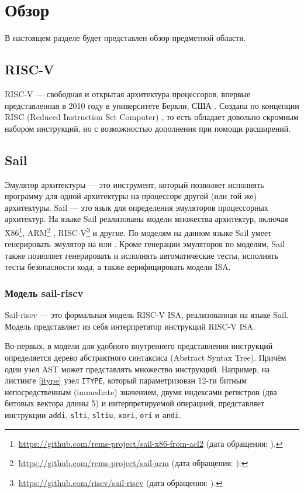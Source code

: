 
\section{Обзор}
\label{sec:relatedworks}

В настоящем разделе будет представлен обзор предметной области.

\subsection{RISC-V}
RISC-V --- свободная и открытая архитектура процессоров, впервые представленная в 2010 году в университете Беркли, США \cite{waterman2016design}.
Создана по концепции RISC (Reduced Instruction Set Computer) \cite{jamil1995risc}, то есть обладает довольно скромным набором инструкций, но с возможностью дополнения при помощи расширений.


\subsection{Sail}
Эмулятор архитектуры --- это инструмент, который позволяет исполнять программу для одной архитектуры на процессоре другой (или той же) архитектуры.
Sail --- это язык для определения эмуляторов процессорных архитектур.
На языке Sail реализованы модели множества архитектур, включая X86\footnote{\url{https://github.com/rems-project/sail-x86-from-acl2} (дата обращения: ).}, ARM\footnote{\url{https://github.com/rems-project/sail-arm} (дата обращения: ).} \cite{armstrong2019isa}, RISC-V\footnote{\url{https://github.com/riscv/sail-riscv} (дата обращения: ).} \cite{armstrong2019isa} и другие.
По моделям на данном языке Sail умеет генерировать эмулятор на \OCaml{} или \C{}.
Кроме генерации эмуляторов по моделям, Sail также позволяет генерировать и исполнять автоматические тесты, исполнять тесты безопасности кода, а также верифицировать модели ISA.

\subsubsection{Модель sail-riscv}
Sail-riscv --- это формальная модель RISC-V ISA, реализованная на языке Sail.
Модель представляет из себя интерпретатор инструкций RISC-V ISA.

Во-первых, в модели для удобного внутреннего пред\-ставления инструкций определяется дерево абстрактного синтаксиса (Ab\-stract Syntax Tree).
Причём один узел AST может представлять множество инструкций.
Например, на листинге \ref{itype} узел \texttt{ITYPE}, который параметризован 12-ти битным непосредственным (immediate) значением, двумя индексами регистров (два битовых вектора длины 5) и интерпретируемой операцией, представляет инструкции \texttt{addi}, \texttt{slti}, \texttt{sltiu}, \texttt{xori}, \texttt{ori} и \texttt{andi}.

